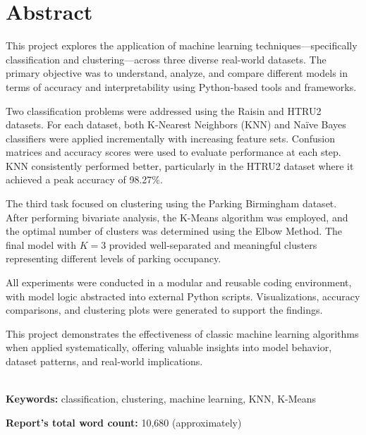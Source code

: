 \chapter*{\center \Large  Abstract}

This project explores the application of machine learning techniques—specifically classification and clustering—across three diverse real-world datasets. The primary objective was to understand, analyze, and compare different models in terms of accuracy and interpretability using Python-based tools and frameworks.

Two classification problems were addressed using the Raisin and HTRU2 datasets. For each dataset, both K-Nearest Neighbors (KNN) and Naïve Bayes classifiers were applied incrementally with increasing feature sets. Confusion matrices and accuracy scores were used to evaluate performance at each step. KNN consistently performed better, particularly in the HTRU2 dataset where it achieved a peak accuracy of 98.27\%.

The third task focused on clustering using the Parking Birmingham dataset. After performing bivariate analysis, the K-Means algorithm was employed, and the optimal number of clusters was determined using the Elbow Method. The final model with $K=3$ provided well-separated and meaningful clusters representing different levels of parking occupancy.

All experiments were conducted in a modular and reusable coding environment, with model logic abstracted into external Python scripts. Visualizations, accuracy comparisons, and clustering plots were generated to support the findings.

This project demonstrates the effectiveness of classic machine learning algorithms when applied systematically, offering valuable insights into model behavior, dataset patterns, and real-world implications.

~\\[1cm]
\noindent\textbf{Keywords:} classification, clustering, machine learning, KNN, K-Means

\vfill
\noindent
\textbf{Report's total word count:} 10,680 (approximately)

